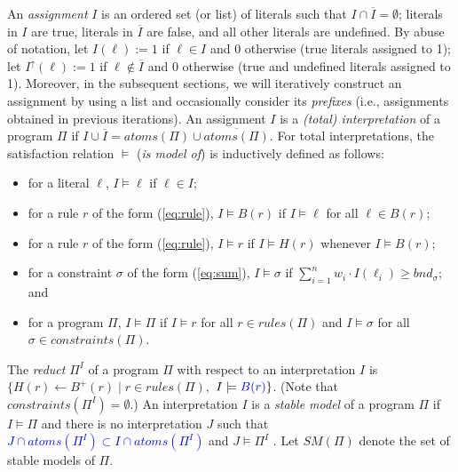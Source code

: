 \documentclass[preprint,authoryear]{elsarticle}
\newcommand{\atoms}{\mathit{atoms}}
\theoremstyle{definition}
\begin{document}
An \emph{assignment} $I$ is an ordered set (or list) of literals such that $I \cap \overline{I} = \emptyset$;  %
literals in $I$ are true, literals in $\overline{I}$ are false, and all other literals are undefined.
By abuse of notation, let $I(\ell) := 1$ if $\ell \in I$ and $0$ otherwise (true literals assigned to 1);
let $I^\uparrow(\ell) := 1$ if $\ell \notin \overline{I}$ and $0$ otherwise (true and undefined literals assigned to 1).
Moreover, in the subsequent sections, we will iteratively construct an assignment by using a list and occasionally consider its \emph{prefixes} (i.e., assignments obtained in previous iterations).
%
An assignment $I$ is a \emph{(total) interpretation} of a program $\Pi$ if $I \cup \overline{I} = \mathit{atoms}(\Pi) \cup \overline{\mathit{atoms}(\Pi)}$.
%
For total interpretations, the satisfaction relation $\models$ (\emph{is model of}) is inductively defined as follows:
\begin{itemize}
    \item for a literal $\ell$, $I \models \ell$ if $\ell \in I$;
    \item for a rule $r$ of the form (\ref{eq:rule}), $I \models B(r)$ if $I \models \ell$ for all $\ell \in B(r)$;
    \item for a rule $r$ of the form (\ref{eq:rule}), $I \models r$ if $I \models H(r)$ whenever $I \models B(r)$;
    \item for a constraint $\sigma$ of the form (\ref{eq:sum}), $I \models \sigma$ if 
$\sum_{i = 1}^{n}{w_i \cdot I(\ell_i)} \geq \mathit{bnd}_\sigma$; and 
    \item for a program $\Pi$, $I \models \Pi$ if $I \models r$ for all $r \in \mathit{rules}(\Pi)$ and $I \models \sigma$ for all $\sigma \in \mathit{constraints}(\Pi)$.
\end{itemize}
%
The \emph{reduct} $\Pi^I$ of a program $\Pi$ with respect to an interpretation $I$ is $\{H(r) \leftarrow B^+(r) \mid r \in \mathit{rules}(\Pi),$ $I \models \textcolor{blue}{B(r)} \}$.
(Note that $\mathit{constraints}(\Pi^I) = \emptyset$.)
%
An interpretation $I$ is a \emph{stable model} of a program $\Pi$ if $I \models \Pi$ and there is no interpretation $J$ such that \textcolor{blue}{$J \cap \atoms(\Pi^I) \subset I \cap \atoms(\Pi^I)$} and $J \models \Pi^I$ \citep{DBLP:journals/ai/FaberPL11}.
Let $\mathit{SM}(\Pi)$ denote the set of stable models of $\Pi$.
\end{document}
